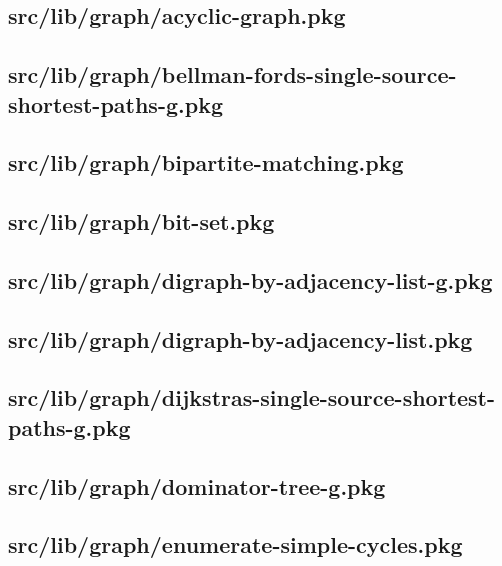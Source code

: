 \subsection{src/lib/graph/acyclic-graph.pkg}


\subsection{src/lib/graph/bellman-fords-single-source-shortest-paths-g.pkg}


\subsection{src/lib/graph/bipartite-matching.pkg}


\subsection{src/lib/graph/bit-set.pkg}


\subsection{src/lib/graph/digraph-by-adjacency-list-g.pkg}


\subsection{src/lib/graph/digraph-by-adjacency-list.pkg}


\subsection{src/lib/graph/dijkstras-single-source-shortest-paths-g.pkg}


\subsection{src/lib/graph/dominator-tree-g.pkg}


\subsection{src/lib/graph/enumerate-simple-cycles.pkg}


